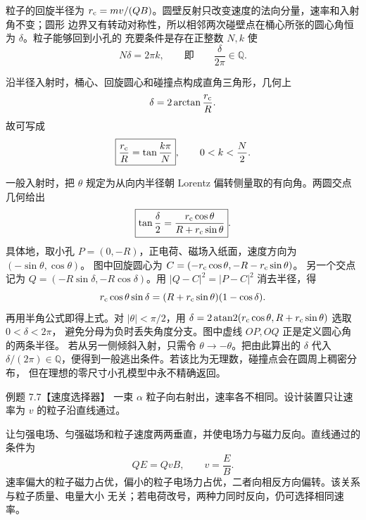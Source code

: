 \begin{xesolution}
粒子的回旋半径为 $r_{\rm c}=mv/(QB)$。圆壁反射只改变速度的法向分量，速率和入射角不变；圆形
边界又有转动对称性，所以相邻两次碰壁点在桶心所张的圆心角恒为 $\delta$。粒子能够回到小孔的
充要条件是存在正整数 $N,k$ 使
\begin{equation}
  N\delta=2\pi k,
  \qquad\text{即}\qquad \boxed{\frac{\delta}{2\pi}\in\mathbb Q}.
\end{equation}

沿半径入射时，桶心、回旋圆心和碰撞点构成直角三角形，几何上
\begin{equation}
  \delta=2\arctan\frac{r_{\rm c}}R.
\end{equation}
故可写成
\begin{equation}
  \boxed{\frac{r_{\rm c}}R=\tan\frac{k\pi}{N}},
  \qquad 0<k<\frac N2.
\end{equation}

一般入射时，把 $\theta$ 规定为从向内半径朝 Lorentz 偏转侧量取的有向角。两圆交点几何给出
\begin{equation}
  \boxed{\tan\frac\delta2=
  \frac{r_{\rm c}\cos\theta}{R+r_{\rm c}\sin\theta}}.
\end{equation}
具体地，取小孔 $P=(0,-R)$，正电荷、磁场入纸面，速度方向为 $(-\sin\theta,\cos\theta)$。
图中回旋圆心为 $C=(-r_{\rm c}\cos\theta,-R-r_{\rm c}\sin\theta)$。
另一个交点记为 $Q=(-R\sin\delta,-R\cos\delta)$。用 $|Q-C|^2=|P-C|^2$ 消去半径，得
\[
 r_{\rm c}\cos\theta\sin\delta
 =(R+r_{\rm c}\sin\theta)(1-\cos\delta).
\]
再用半角公式即得上式。对 $|\theta|<\pi/2$，用
$\delta=2\operatorname{atan2}(r_{\rm c}\cos\theta,R+r_{\rm c}\sin\theta)$ 选取 $0<\delta<2\pi$，
避免分母为负时丢失角度分支。图中虚线 $OP,OQ$ 正是定义圆心角的两条半径。
若从另一侧倾斜入射，只需令 $\theta\to-\theta$。把由此算出的 $\delta$ 代入
$\delta/(2\pi)\in\mathbb Q$，便得到一般逃出条件。若该比为无理数，碰撞点会在圆周上稠密分布，
但在理想的零尺寸小孔模型中永不精确返回。

\magneticBilliardDiagram
\end{xesolution}

\Needspace{0.34\textheight}
\begin{origexamplebox}{例题 7.7【速度选择器】}
一束 $\alpha$ 粒子向右射出，速率各不相同。设计装置只让速率为 $v$ 的粒子沿直线通过。
\end{origexamplebox}

\begin{xesolution}
让匀强电场、匀强磁场和粒子速度两两垂直，并使电场力与磁力反向。直线通过的条件为
\begin{equation}
  Q E=QvB,
  \qquad \boxed{v=\frac EB}.
\end{equation}
速率偏大的粒子磁力占优，偏小的粒子电场力占优，二者向相反方向偏转。该关系与粒子质量、电量大小
无关；若电荷改号，两种力同时反向，仍可选择相同速率。

\velocitySelectorDiagram
\end{xesolution}

